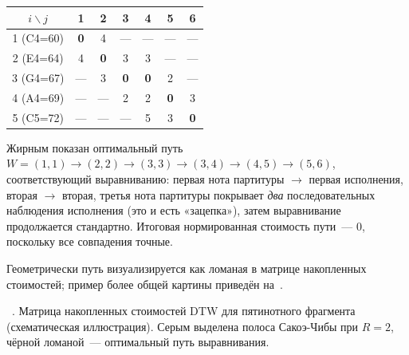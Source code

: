 \par\addvspace{2pt}
{\centering
\footnotesize
\begin{tabular}{c|cccccc}
\toprule
$i\backslash j$ & 1 & 2 & 3 & 4 & 5 & 6 \\
\midrule
1 (C4=60) & \textbf{0} & 4  & ---& ---& ---& ---\\
2 (E4=64) & 4 & \textbf{0}  & 3  & 3  & ---& ---\\
3 (G4=67) & ---& 3  & \textbf{0}  & \textbf{0}  & 2 & ---\\
4 (A4=69) & ---& ---& 2  & 2  & \textbf{0}  & 3 \\
5 (C5=72) & ---& ---& ---& 5 & 3 & \textbf{0} \\
\bottomrule
\end{tabular}\par
\vspace{2pt}}
\addvspace{4pt}

Жирным показан оптимальный путь $W = (1,1)\to(2,2)\to(3,3)\to
(3,4)\to(4,5)\to(5,6)$, соответствующий выравниванию: первая
нота партитуры $\to$ первая исполнения, вторая $\to$ вторая,
третья нота партитуры покрывает \textit{два} последовательных
наблюдения исполнения (это и есть «зацепка»), затем
выравнивание продолжается стандартно. Итоговая нормированная
стоимость пути~--- $0$, поскольку все совпадения точные.

Геометрически путь визуализируется как ломаная в матрице
накопленных стоимостей; пример более общей картины приведён
на~.

\par\addvspace{2pt}
{\centering
{}%
\resizebox{0.85\columnwidth}{!}{}\par
\vspace{2pt}
\footnotesize
\figurename~\thefigure. Матрица накопленных стоимостей DTW для
пятинотного фрагмента (схематическая иллюстрация). Серым
выделена полоса Сакоэ-Чибы при $R=2$, чёрной ломаной~---
оптимальный путь выравнивания.\par}
\addvspace{4pt}

